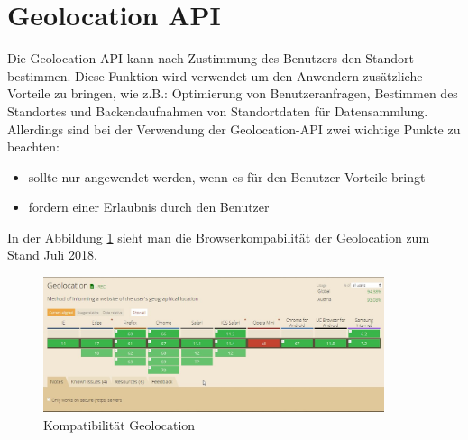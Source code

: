 \newpage
\section{Geolocation API}
Die Geolocation API kann nach Zustimmung des Benutzers den Standort bestimmen. Diese Funktion wird verwendet  um den Anwendern zusätzliche Vorteile zu bringen, wie z.B.: Optimierung von Benutzeranfragen, Bestimmen des Standortes und Backendaufnahmen von Standortdaten für Datensammlung. 
Allerdings sind bei der Verwendung der Geolocation-API zwei wichtige Punkte zu beachten:

\begin{itemize}
    \item  sollte nur angewendet werden, wenn es für den Benutzer Vorteile bringt 
	\item  fordern einer Erlaubnis durch den Benutzer  
\end{itemize}




In der Abbildung \ref{fig:BrowserGL} sieht man die Browserkompabilität der Geolocation zum Stand Juli 2018.
\begin{figure}[H]
	\centering
	\includegraphics[width=10cm]{BilderAllgemein/BrowserGL}\medskip
	\caption{Kompatibilität Geolocation \cite{BrowserSupport}}
	\label{fig:BrowserGL}
\end{figure}









